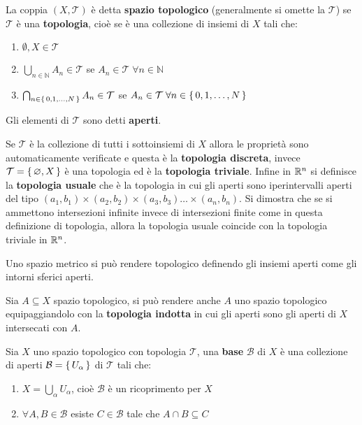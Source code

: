 \begin{definition}
  La coppia $ (X, \mathcal{T}) $ è detta \textbf{spazio topologico}
  (generalmente si omette la $ \mathcal{T} $)
  se $ \mathcal{T} $ è una \textbf{topologia}, cioè se è una collezione di insiemi di $ X $ tali che:
  \begin{enumerate}
  \item $ \emptyset, X \in \mathcal{T} $
  \item $ \bigcup_{n \in \mathbb{N}} A_n \in \mathcal{T} $ se $ A_n \in \mathcal{T} \; \forall n \in \mathbb{N} $
  \item $ \bigcap_{n \in \set{0,1,\dots,N} } A_n \in \mathcal{T} $ se $ A_n \in \mathcal{T} \; \forall n \in \set{0,1,\dots,N} $
  \end{enumerate}
  Gli elementi di $ \mathcal{T} $ sono detti \textbf{aperti}.
\end{definition}
\begin{osservation}
  Se $ \mathcal{T} $ è la collezione di tutti i sottoinsiemi di $ X $ allora le
  proprietà sono automaticamente verificate e questa è la \textbf{topologia
    discreta}, invece
  $ \mathcal{T} = \set{\varnothing, X} $ è una topologia ed è la \textbf{topologia
    triviale}. Infine in $ \mathbb{R}^{n} $ si definisce la \textbf{topologia usuale}
  che è la topologia in cui gli aperti sono iperintervalli aperti del tipo
  $ (a_1,b_1) \times (a_2, b_2) \times (a_3, b_3) \dots \times (a_n, b_n) $. Si dimostra che se si
  ammettono intersezioni infinite invece di intersezioni finite come in questa
  definizione di topologia, allora la topologia usuale coincide con la topologia
  triviale in $ \mathbb{R}^{n} $.
\end{osservation}

\begin{osservation}
  Uno spazio metrico si può rendere topologico definendo gli insiemi aperti come gli intorni sferici aperti.
\end{osservation}

\begin{osservation}
  Sia $ A \subseteq X $ spazio topologico, si può rendere anche $ A $ uno spazio topologico equipaggiandolo con la
  \textbf{topologia indotta} in cui gli aperti sono gli aperti di $ X $ intersecati
  con $ A $.
\end{osservation}
\begin{definition}
  Sia $ X $ uno spazio topologico con topologia $ \mathcal{T} $, una
  \textbf{base} $ \mathcal{B} $ di $ X $ è
  una collezione di aperti $ \mathcal{B} = \set{U_\alpha} $ di $ \mathcal{T} $ tali
  che:
  \begin{enumerate}
  \item $ X = \bigcup_\alpha U_\alpha $, cioè $ \mathcal{B} $ è un ricoprimento per $ X $
  \item $ \forall A,B \in \mathcal{B} $ esiste $ C \in \mathcal{B} $ tale che $ A \cap B \subseteq C $
  \end{enumerate}
\end{definition}

